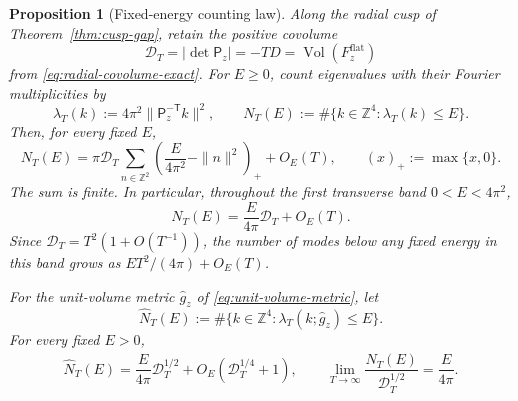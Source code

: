 \documentclass[11pt]{article}
\numberwithin{equation}{section}
\newtheorem{proposition}[theorem]{Proposition}
\theoremstyle{definition}
\theoremstyle{remark}
\newcommand{\Z}{\mathbb Z}
\begin{document}
\begin{proposition}[Fixed-energy counting law]\label{prop:fixed-energy-count}
Along the radial cusp of Theorem~\ref{thm:cusp-gap}, retain the positive
covolume
\begin{equation}\label{eq:covolume-DT}
 \mathcal D_T=|\det\mathsf P_z|=-TD
 =\operatorname{Vol}(F_z^{\mathrm{flat}})
\end{equation}
from \eqref{eq:radial-covolume-exact}.
For $E\ge0$, count eigenvalues with their Fourier multiplicities by
\begin{equation}\label{eq:counting-definition}
 \lambda_T(k):=4\pi^2\|\mathsf P_z^{-\mathsf T}k\|^2,
 \qquad
 N_T(E):=\#\{k\in\Z^4:\lambda_T(k)\le E\}.
\end{equation}
Then, for every fixed $E$,
\begin{equation}\label{eq:fixed-energy-all-bands}
 N_T(E)=\pi\mathcal D_T
 \sum_{n\in\Z^2}
 \left(\frac{E}{4\pi^2}-\|n\|^2\right)_+
 +O_E(T),
 \qquad (x)_+:=\max\{x,0\}.
\end{equation}
The sum is finite.  In particular, throughout the first transverse band
$0<E<4\pi^2$,
\begin{equation}\label{eq:fixed-energy-first-band}
 \boxed{N_T(E)=\frac{E}{4\pi}\mathcal D_T+O_E(T).}
\end{equation}
Since $\mathcal D_T=T^2(1+O(T^{-1}))$, the number of modes below any fixed
energy in this band grows as $ET^2/(4\pi)+O_E(T)$.

For the unit-volume metric $\widehat g_z$ of
\eqref{eq:unit-volume-metric}, let
\begin{equation}\label{eq:unit-volume-count-definition}
 \widehat N_T(E):=
 \#\{k\in\Z^4:\lambda_T(k;\widehat g_z)\le E\}.
\end{equation}
For every fixed $E>0$,
\begin{equation}\label{eq:unit-volume-count}
 \widehat N_T(E)
 =\frac{E}{4\pi}\mathcal D_T^{1/2}
 +O_E(\mathcal D_T^{1/4}+1),
 \qquad
 \lim_{T\to\infty}
 \frac{\widehat N_T(E)}{\mathcal D_T^{1/2}}
 =\frac{E}{4\pi}.
\end{equation}


\end{proposition}
\end{document}
